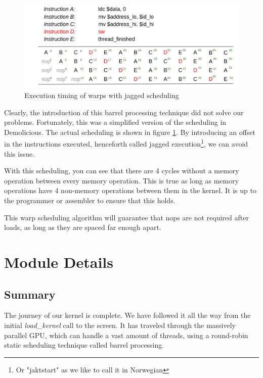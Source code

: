 \documentclass[../main/report.tex]{subfiles}
\begin{document}
\begin{figure}[htp]
\centering
\includegraphics[scale=0.25]{../gpu/diagrams/jaktstart_num.png}
\caption{Execution timing of warps with jagged scheduling}
\label{fig:jagged}
\end{figure}

Clearly, the introduction of this barrel processing technique did not solve our problems.
Fortunately, this was a simplified version of the scheduling in Demolicious.
The actual scheduling is shown in figure \ref{fig:jagged}.
By introducing an offset in the instructions executed, henceforth called jagged execution\footnote{Or "jaktstart" as we like to call it in Norwegian}, we can avoid this issue.

With this scheduling, you can see that there are 4 cycles without a memory operation between every memory operation.
This is true as long as memory operations have 4 non-memory operations between them in the kernel.
It is up to the programmer or assembler to ensure that this holds.

This warp scheduling algorithm will guarantee that nops are not required after loads,
as long as they are spaced far enough apart.

\section{Module Details}













\subsection{Summary}
The journey of our kernel is complete.
We have followed it all the way from the initial \emph{load\_kernel} call to the screen.
It has traveled through the massively parallel GPU, which can handle a vast amount of threads,
using a round-robin static scheduling technique called barrel processing.
\end{document}
